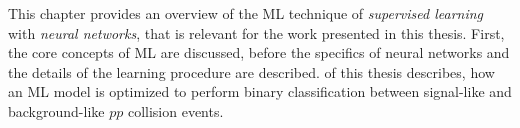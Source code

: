 This chapter provides an overview of the ML technique of \emph{supervised learning} with \emph{neural networks}, that is relevant for the work presented in this thesis. 
First, the core concepts of ML are discussed, before the specifics of neural networks and the details of the learning procedure are described.
 of this thesis describes, how an ML model is optimized to perform binary classification between signal-like and background-like $pp$ collision events. 





